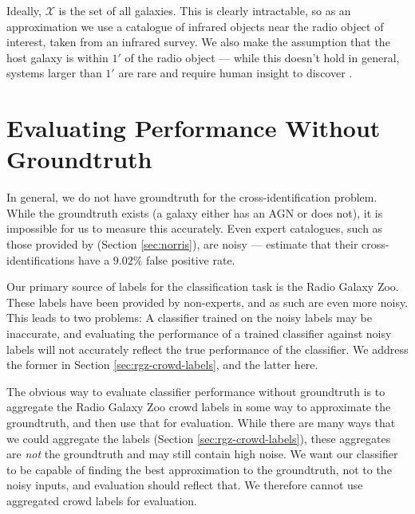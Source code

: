   Ideally, $\mathcal X$ is the set of all galaxies. This is clearly
  intractable, so as an approximation we use a catalogue of infrared objects
  near the radio object of interest, taken from an infrared survey. We also
  make the assumption that the host galaxy is within $1'$ of the radio object
  --- while this doesn't hold in general, systems larger than $1'$ are rare and
  require human insight to discover \citep{banfield16}.

\section{Evaluating Performance Without Groundtruth}
  \label{sec:norris-as-groundtruth}

  In general, we do not have groundtruth for the cross-identification problem.
  While the groundtruth exists (a galaxy either has an AGN or does not), it is
  impossible for us to measure this accurately. Even expert catalogues, such as
  those provided by \citeauthor{norris06} (Section \ref{sec:norris}), are noisy
  --- \citep{norris06} estimate that their cross-identifications have a $9.02\%$
  false positive rate.
  
  Our primary source of labels for the classification task is the Radio Galaxy
  Zoo. These labels have been provided by non-experts, and as such are even more
  noisy. This leads to two problems: A classifier trained on the noisy labels
  may be inaccurate, and evaluating the performance of a trained classifier
  against noisy labels will not accurately reflect the true performance of the
  classifier. We address the former in Section \ref{sec:rgz-crowd-labels}, and
  the latter here.

  The obvious way to evaluate classifier performance without groundtruth is to
  aggregate the Radio Galaxy Zoo crowd labels in some way to approximate the
  groundtruth, and then use that for evaluation. While there are many ways that
  we could aggregate the labels (Section \ref{sec:rgz-crowd-labels}), these
  aggregates are \emph{not} the groundtruth and may still contain high noise. We
  want our classifier to be capable of finding the best approximation to the
  groundtruth, not to the noisy inputs, and evaluation should reflect that. We
  therefore cannot use aggregated crowd labels for evaluation.

